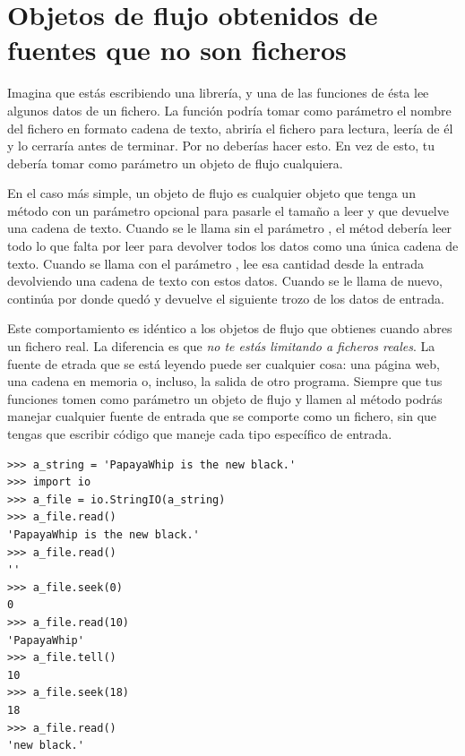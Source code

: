 \section{Objetos de flujo obtenidos de fuentes que no son ficheros}

Imagina que estás escribiendo una librería, y una de las funciones de ésta lee algunos datos de un fichero. La función podría tomar como parámetro el nombre del fichero en formato cadena de texto, abriría el fichero para lectura, leería de él y lo cerraría antes de terminar. Por no deberías hacer esto. En vez de esto, tu  debería tomar como parámetro un objeto de flujo cualquiera.


En el caso más simple, un objeto de flujo es cualquier objeto que tenga un método  con un parámetro opcional  para pasarle el tamaño a leer y que devuelve una cadena de texto. Cuando se le llama sin el parámetro , el métod  debería leer todo lo que falta por leer para devolver todos los datos como una única cadena de texto. Cuando se llama con el parámetro , lee esa cantidad desde la entrada devolviendo una cadena de texto con estos datos. Cuando se le llama de nuevo, continúa por donde quedó y devuelve el siguiente trozo de los datos de entrada.

Este comportamiento es idéntico a los objetos de flujo que obtienes cuando abres un fichero real. La diferencia es que \emph{no te estás limitando a ficheros reales}. La fuente de etrada que se está leyendo puede ser cualquier cosa: una página web, una cadena en memoria o, incluso, la salida de otro programa. Siempre que tus funciones tomen como parámetro un objeto de flujo y llamen al método  podrás manejar cualquier fuente de entrada que se comporte como un fichero, sin que tengas que escribir código que maneje cada tipo específico de entrada.

\noindent\begin{minipage}{\textwidth}
\begin{lstlisting}[mathescape=True]
>>> a_string = 'PapayaWhip is the new black.'
>>> import io 
>>> a_file = io.StringIO(a_string)
>>> a_file.read()               
'PapayaWhip is the new black.'
>>> a_file.read()              
''
>>> a_file.seek(0)            
0
>>> a_file.read(10)          
'PapayaWhip'
>>> a_file.tell()                       
10
>>> a_file.seek(18)
18
>>> a_file.read()
'new black.'
\end{lstlisting}
\end{minipage}

